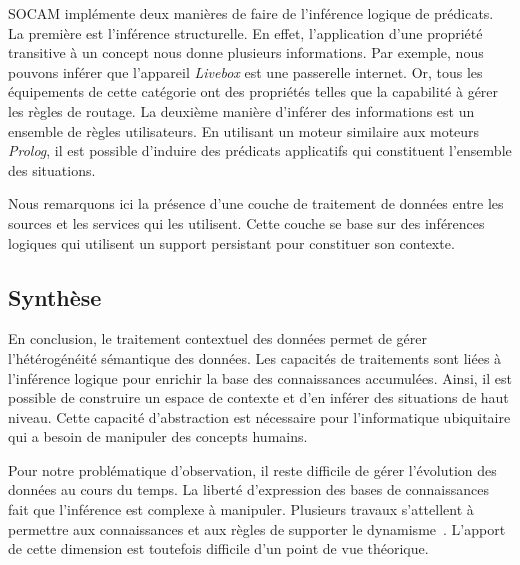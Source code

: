 SOCAM implémente deux manières de faire de l'inférence logique de prédicats. La première est l'inférence structurelle. En effet, l'application d'une propriété transitive à un concept nous donne plusieurs informations. Par exemple, nous pouvons inférer que l'appareil \textit{Livebox} est une passerelle internet. Or, tous les équipements de cette catégorie ont des propriétés telles que la capabilité à gérer les règles de routage. La deuxième manière d'inférer des informations est un ensemble de règles utilisateurs. En utilisant un moteur similaire aux moteurs \textit{Prolog}, il est possible d'induire des prédicats applicatifs qui constituent l'ensemble des situations.

Nous remarquons ici la présence d'une couche de traitement de données entre les sources et les services qui les utilisent. Cette couche se base sur des inférences logiques qui utilisent un support persistant pour constituer son contexte.

\subsection{Synthèse}
En conclusion, le traitement contextuel des données permet de gérer l'hétérogénéité sémantique des données. Les capacités de traitements sont liées à l'inférence logique pour enrichir la base des connaissances accumulées. Ainsi, il est possible de construire un espace de contexte et d'en inférer des situations de haut niveau. Cette capacité d'abstraction est nécessaire pour l'informatique ubiquitaire qui a besoin de manipuler des concepts humains.

Pour notre problématique d'observation, il reste difficile de gérer l'évolution des données au cours du temps. La liberté d'expression des bases de connaissances fait que l'inférence est complexe à manipuler. Plusieurs travaux s’attellent à permettre aux connaissances et aux règles de supporter le dynamisme~\cite{Weikum:webknowledge, Hellerstein:declarative}. L'apport de cette dimension est toutefois difficile d'un point de vue théorique.

